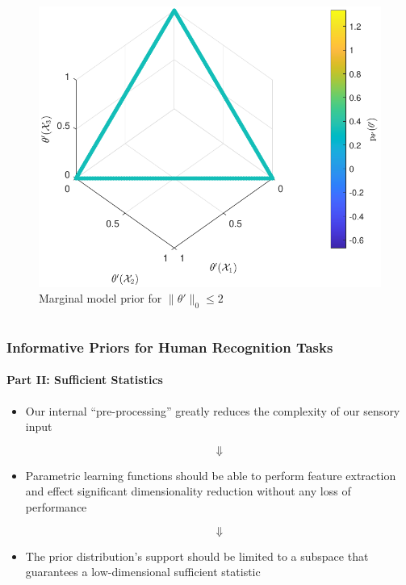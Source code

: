 \documentclass[aspectratio=169,usenames,dvipsnames]{beamer}
\begin{document}
\begin{frame}
\begin{columns}[c]
\begin{column}{.5\linewidth}
\begin{figure}
\centering
\includegraphics[width=0.9\linewidth]{P_theta_limited_obs.pdf}
\caption{Marginal model prior for $\big\| \theta' \big\|_0 \leq 2$}
\label{fig:P_theta_limited_obs}
\end{figure}

\end{column}

\end{columns}

\end{frame}




\begin{frame}
\frametitle{Informative Priors for Human Recognition Tasks}
\framesubtitle{Part II: Sufficient Statistics}

\begin{itemize}
\item Our internal ``pre-processing'' greatly reduces the complexity of our sensory input

\vspace{-1em}
\Large
\begin{equation*} 
\Downarrow
\end{equation*}
\normalsize

\item Parametric learning functions should be able to perform feature extraction and effect significant dimensionality reduction \alert{without any loss of performance}

\vspace{-1em}
\Large
\begin{equation*} 
\Downarrow
\end{equation*}
\normalsize

\item The prior distribution's support should be limited to a subspace that guarantees a low-dimensional \alert{sufficient statistic}
\end{itemize}


\end{frame}
\end{document}
